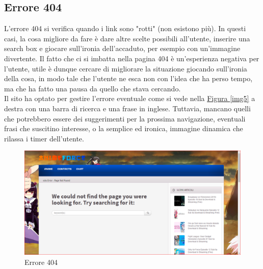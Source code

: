 \subsection{Errore 404}
L'errore 404 si verifica quando i link sono "rotti" (non esistono più). In questi casi, la cosa migliore da fare è dare altre scelte possibili all'utente, inserire una search box  e giocare sull'ironia dell'accaduto, per esempio con un’immagine divertente. Il fatto che ci si imbatta nella pagina 404 è un’esperienza negativa per l’utente, utile è dunque cercare di migliorare la situazione giocando sull'ironia della cosa, in modo tale che l’utente ne esca non con l’idea che ha perso tempo, ma che ha fatto una pausa da quello che stava cercando.  \\
Il sito ha optato per gestire l'errore eventuale come si vede nella \hyperref[img5]{Figura \ref{img5}} a destra con una barra di ricerca e una frase in inglese. Tuttavia, mancano quelli che potrebbero essere dei suggerimenti per la prossima navigazione, eventuali frasi che suscitino interesse, o la semplice ed ironica, immagine dinamica che rilassa i timer dell'utente.
\begin{figure}[H]
	\centering
	\includegraphics[width=1\textwidth]{img/Errore404.png}
	\caption{Errore 404} 
	\label{img6} 
\end{figure}